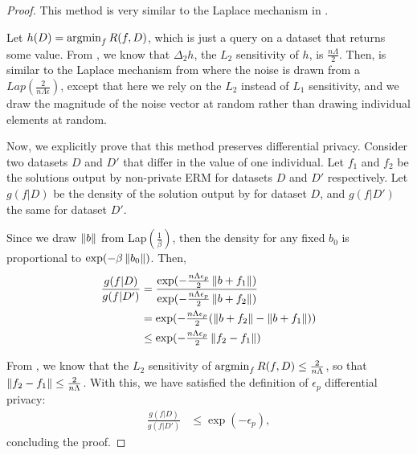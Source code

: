 \documentclass{article} %
\begin{document}
\begin{proof}
This method is very similar to the Laplace mechanism in .

Let $h(D) = \operatorname*{argmin}_f R(f, D)$, which is just a query on a dataset that
returns some value. From , we know that
$\Delta_2 h$, the $L_2$ sensitivity of $h$, is $\frac{n \Lambda}{2}$. Then,
 is similar to the Laplace mechanism from
 where the noise is drawn from a
$Lap(\frac{2}{n \Lambda \epsilon})$, except that here we rely on the $L_2$
instead of $L_1$ sensitivity, and we draw the magnitude of the noise vector at
random rather than drawing individual elements at random.

Now, we explicitly prove that this method preserves differential privacy.
Consider two datasets $D$ and $D'$ that differ in the value of one individual.
Let $f_1$ and $f_2$ be the solutions output by non-private ERM for datasets $D$
and $D'$ respectively. Let $g(f | D)$ be the density of the solution output by
 for dataset $D$, and $g(f | D')$ the same for dataset
$D'$.

Since we draw $\left\lVert b\right\rVert$ from Lap$(\frac{1}{\beta})$, then the density for
any fixed $b_0$ is proportional to $\exp(-\beta \left\lVert b_0\right\rVert)$. Then,
\begin{align*}
\frac{g(f | D)}{g(f | D')}
    &= \frac{
         \exp(-\tfrac{n\Lambda\epsilon_p}{2} \left\lVert b + f_1\right\rVert)
       }{
         \exp(-\tfrac{n\Lambda\epsilon_p}{2} \left\lVert b + f_2\right\rVert)
       } \\
    &= \exp(-\tfrac{n\Lambda\epsilon_p}{2} (\left\lVert b + f_2\right\rVert - \left\lVert b + f_1\right\rVert)) \\
    &\leq \exp(-\tfrac{n\Lambda\epsilon_p}{2} \left\lVert f_2 - f_1\right\rVert)
\end{align*}

From , we know that the $L_2$ sensitivity
of $\operatorname*{argmin}_f R(f, D) \leq \frac{2}{n \Lambda}$, so that
$\left\lVert f_2 - f_1\right\rVert \leq \frac{2}{n \Lambda}$. With this, we have satisfied the
definition of $\epsilon_p$ differential privacy:
\begin{align*}
\frac{g(f | D)}{g(f | D')} &\leq \exp(-\epsilon_p),
\end{align*}
concluding the proof.
\end{proof}
\end{document}

